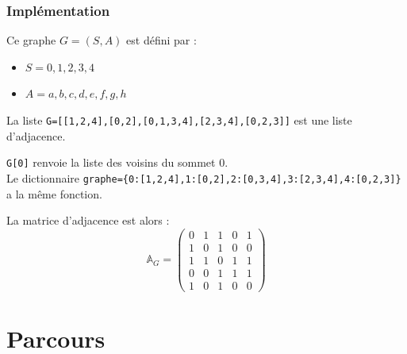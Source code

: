 \begin{frame}[fragile]
\frametitle{Implémentation}
\begin{minipage}[l]{0.25\linewidth}
\end{minipage}
\begin{minipage}[l]{0.7\linewidth}
Ce graphe $G=(S,A)$ est défini par :
\begin{itemize}
\item $S={0,1,2,3,4}$
\item $A={a, b, c, d, e, f, g, h}$
\end{itemize}
\end{minipage}

La liste \verb?G=[[1,2,4],[0,2],[0,1,3,4],[2,3,4],[0,2,3]]? \hspace{0cm} est une liste d'adjacence.

\verb?G[0]? renvoie la liste des voisins du sommet 0.\\
Le dictionnaire \verb?graphe={0:[1,2,4],1:[0,2],2:[0,3,4],3:[2,3,4],4:[0,2,3]}? a la même fonction.

La matrice d'adjacence est alors :
$$\mathbb{A}_G=
\begin{pmatrix}
0 & 1 & 1 & 0 & 1 \\
1 & 0 & 1 & 0 & 0 \\
1 & 1 & 0 & 1 & 1 \\
0 & 0 & 1 & 1 & 1 \\
1 & 0 & 1 & 0 & 0  
\end{pmatrix}$$

\end{frame}

\section{Parcours}

